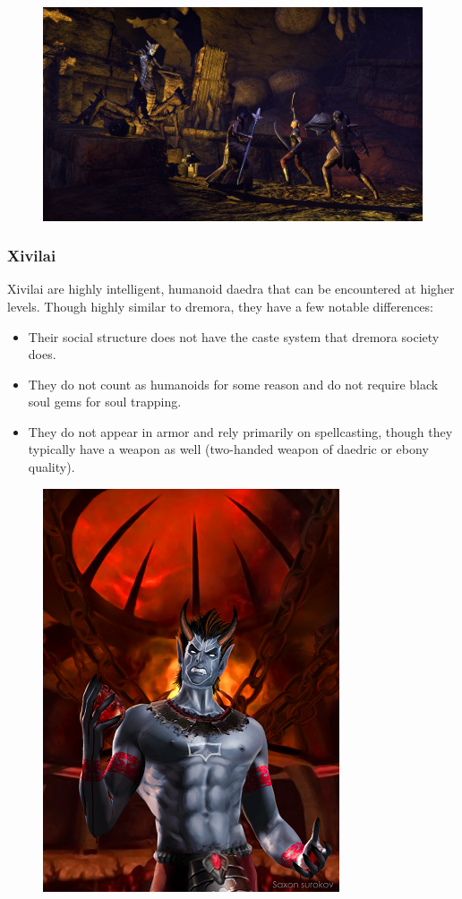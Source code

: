 \documentclass[12pt]{book}
\begin{document}
\begin{figure}[h]
	\centering
	\includegraphics[scale=0.75]{spiderdaedra.png}
\end{figure}

\subsubsection{Xivilai}

Xivilai are highly intelligent, humanoid daedra that can be encountered at higher levels. Though highly similar to dremora, they have a few notable differences:

\begin{itemize}
	\item Their social structure does not have the caste system that dremora society does.
	\item They do not count as humanoids for some reason and do not require black soul gems for soul trapping.
	\item They do not appear in armor and rely primarily on spellcasting, though they typically have a weapon as well (two-handed weapon of daedric or ebony quality).
\end{itemize}

\begin{figure}[h]
	\centering
	\includegraphics[scale=1]{xivilai.png}
\end{figure}
\end{document}
